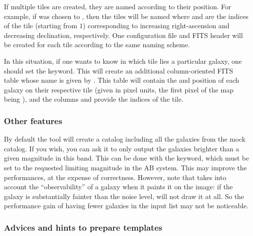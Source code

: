 If multiple tiles are created, they are named according to their position. For example, if  was chosen to , then the tiles will be named  where  and  are the indices of the tile (starting from $1$) corresponding to increasing right-ascension and decreasing declination, respectively. One \skymaker configuration file and FITS header will be created for each tile according to the same naming scheme.

In this situation, if one wants to know in which tile lies a particular galaxy, one should set the  keyword. This will create an additional column-oriented FITS table whose name is given by . This table will contain the  and  position of each galaxy on their respective tile (given in pixel units, the first pixel of the map being ), and the columns  and  provide the indices of the tile.

\subsubsection{Other features}

By default the tool will create a \skymaker catalog including all the galaxies from the mock catalog. If you wish, you can ask it to only output the galaxies brighter than a given magnitude in this band. This can be done with the  keyword, which must be set to the requested limiting magnitude in the AB system. This may improve the performances, at the expense of correctness. However, note that \skymaker takes into account the ``observability'' of a galaxy when it paints it on the image: if the galaxy is substantially fainter than the noise level, \skymaker will not draw it at all. So the performance gain of having fewer galaxies in the input list may not be noticeable.

\subsubsection{Advices and hints to prepare \skymaker templates}

